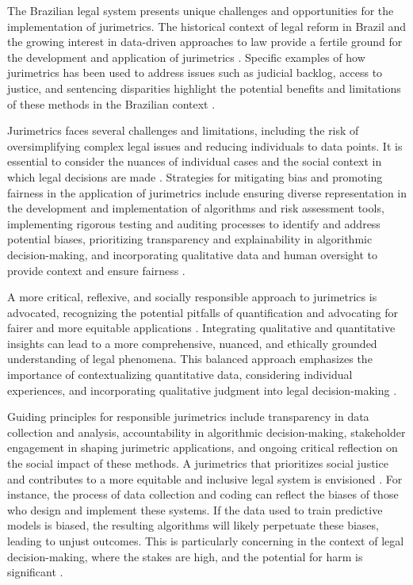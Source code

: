 The Brazilian legal system presents unique challenges and opportunities for the implementation of jurimetrics. The historical context of legal reform in Brazil and the growing interest in data-driven approaches to law provide a fertile ground for the development and application of jurimetrics \cite{10.1007/s11186-021-09453-1,10.3390/fi9040068}. Specific examples of how jurimetrics has been used to address issues such as judicial backlog, access to justice, and sentencing disparities highlight the potential benefits and limitations of these methods in the Brazilian context \cite{10.1007/s11186-021-09453-1,10.3390/fi9040068}.

Jurimetrics faces several challenges and limitations, including the risk of oversimplifying complex legal issues and reducing individuals to data points. It is essential to consider the nuances of individual cases and the social context in which legal decisions are made \cite{10.1007/s11186-021-09453-1}. Strategies for mitigating bias and promoting fairness in the application of jurimetrics include ensuring diverse representation in the development and implementation of algorithms and risk assessment tools, implementing rigorous testing and auditing processes to identify and address potential biases, prioritizing transparency and explainability in algorithmic decision-making, and incorporating qualitative data and human oversight to provide context and ensure fairness \cite{10.1007/s11186-021-09453-1,10.3390/fi9040068}.

A more critical, reflexive, and socially responsible approach to jurimetrics is advocated, recognizing the potential pitfalls of quantification and advocating for fairer and more equitable applications \cite{10.1007/s11186-021-09453-1,10.3390/fi9040068}. Integrating qualitative and quantitative insights can lead to a more comprehensive, nuanced, and ethically grounded understanding of legal phenomena. This balanced approach emphasizes the importance of contextualizing quantitative data, considering individual experiences, and incorporating qualitative judgment into legal decision-making \cite{10.1007/s11186-021-09453-1,10.3390/fi9040068}.

Guiding principles for responsible jurimetrics include transparency in data collection and analysis, accountability in algorithmic decision-making, stakeholder engagement in shaping jurimetric applications, and ongoing critical reflection on the social impact of these methods. A jurimetrics that prioritizes social justice and contributes to a more equitable and inclusive legal system is envisioned \cite{10.1007/s11186-021-09453-1,10.3390/fi9040068}. For instance, the process of data collection and coding can reflect the biases of those who design and implement these systems. If the data used to train predictive models is biased, the resulting algorithms will likely perpetuate these biases, leading to unjust outcomes. This is particularly concerning in the context of legal decision-making, where the stakes are high, and the potential for harm is significant \cite{lee2020}.


